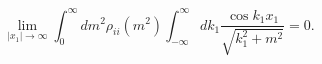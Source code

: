 \begin{equation}
\lim_{|x_1| \rightarrow \infty}
\int_0 ^\infty dm^2 \rho_{ii}(m^2) \int_{-\infty} ^\infty
dk_1 \frac{ \cos k_1 x_1}{\sqrt{k_1^2+m^2}} =0.
\label{cluster2}
\end{equation}

